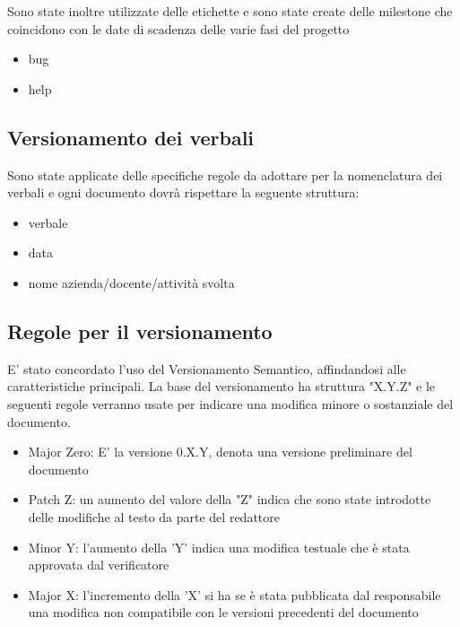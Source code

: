 \documentclass[12pt]{article}
\begin{document}
Sono state inoltre utilizzate delle etichette e sono state create delle milestone che coincidono con le date di scadenza delle varie fasi del progetto
\begin{itemize}
    \item bug
    \item help
\end{itemize}

\subsection{Versionamento dei verbali}
Sono state applicate delle specifiche regole da adottare per la nomenclatura dei verbali e ogni documento dovrà rispettare la seguente struttura:
\begin{itemize}
    \item verbale
    \item data
    \item nome azienda/docente/attività svolta
\end{itemize}

\subsection{Regole per il versionamento}
E' stato concordato l'uso del Versionamento Semantico, affindandosi alle caratteristiche principali.
La base del versionamento ha struttura "X.Y.Z" e le seguenti regole verranno usate per indicare una modifica minore o sostanziale del documento.
\begin{itemize}
    \item Major Zero: E' la versione 0.X.Y, denota una versione preliminare del documento
    \item Patch Z: un aumento del valore della "Z" indica che sono state introdotte delle modifiche al testo da parte del redattore
    \item Minor Y: l'aumento della 'Y' indica una modifica testuale che è stata approvata dal verificatore
    \item Major X: l'incremento della 'X' si ha se è stata pubblicata dal responsabile una modifica non compatibile con le versioni precedenti del documento
\end{itemize}
\end{document}

